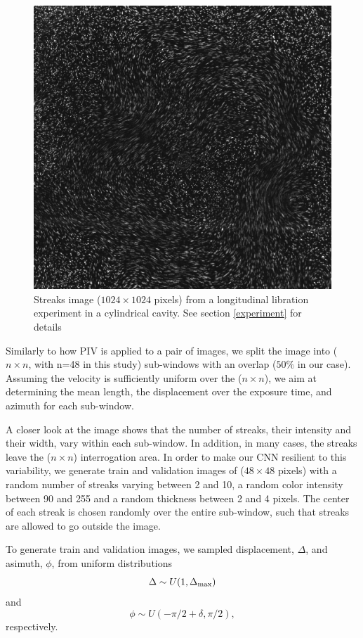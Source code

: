 \documentclass{svjour3}                     %
\begin{document}
\begin{figure}
	\includegraphics[width=\textwidth]{figs/figure0.jpg}
	\caption{Streaks image ($1024\times1024$ pixels) from a longitudinal libration experiment in a cylindrical cavity. See section \ref{experiment} for details}
	\label{fig:expImage}
\end{figure}
Similarly to how PIV is applied to a pair of images, we split the image into ($n \times n$, with n=48 in this study) sub-windows with an overlap ($50\%$ in our case). Assuming the velocity is sufficiently uniform over the ($n \times n$), we aim at determining the mean length, the displacement over the exposure time, and azimuth for each sub-window. 

A closer look at the image shows that the number of streaks, their intensity and their width, vary within each sub-window. In addition, in many cases, the streaks leave the ($n \times n$) interrogation area. In order to make our CNN resilient to this variability, we generate train and validation images of ($48 \times 48$ pixels) with a random number of streaks varying between 2 and 10, a random color intensity between 90 and 255 and a random thickness between 2 and 4 pixels. The center of each streak is chosen randomly over the entire sub-window, such that streaks are allowed to go outside the image.

To generate train and validation images, we sampled displacement, $\Delta$, and asimuth, $\phi$, from uniform distributions
\begin{equation}
\Delta \sim U(1, \Delta_\textnormal{max}) 
\end{equation}
and
\begin{equation}
\phi \sim U(-\pi/2+\delta, \pi/2),
\end{equation}
respectively. 
\end{document}
